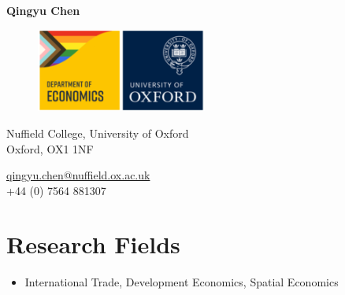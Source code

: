 \documentclass[11pt,letterpaper]{report}
\newcommand{\myname}{Qingyu Chen}
\newcommand{\namefont}[1]{{\normalfont\bfseries\Huge{#1}}}
\begin{document}
    \raggedright{}

    \begin{minipage}[b]{0.500\textwidth}
        \namefont{\myname}
            
    \end{minipage}
    \begin{minipage}[b]{0.495\textwidth}
        \begin{figure}[H]
        \flushright
        \includegraphics[width=0.5\textwidth]{econoxlogo.png}
        \label{fig:my_label}
        \end{figure}     
    \end{minipage}



    \vspace{1em}
    \begin{minipage}[t]{0.700\textwidth}
        Nuffield College, University of Oxford \\
        Oxford, OX1 1NF
        
    \end{minipage}
    \begin{minipage}[t]{0.295\textwidth}
        \href{mailto:qingyu.chen@nuffield.ox.ac.uk}{qingyu.chen@nuffield.ox.ac.uk}\\
        +44 (0) 7564 881307 \\
    \end{minipage}

    \section*{Research Fields}

    \begin{itemize}

        \item International Trade, Development Economics, Spatial Economics

    \end{itemize}
\end{document}

